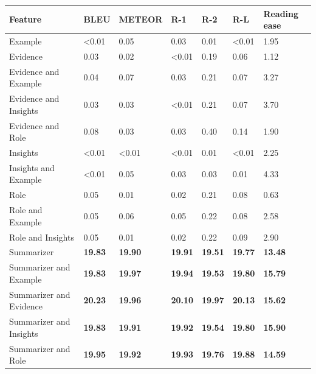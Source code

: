 \begin{tabular}{|l|l|l|l|l|l|l|}
\hline
\textbf{Feature} & BLEU & METEOR & R-1 & R-2 & R-L & Reading ease \\
 \hline
 Example & \textless{}0.01 & 0.05 & 0.03 & 0.01 & \textless{}0.01 & 1.95 \\
 \hline
 Evidence & 0.03 & 0.02 & \textless{}0.01 & 0.19 & 0.06 & 1.12 \\
 \hline
 Evidence and Example & 0.04 & 0.07 & 0.03 & 0.21 & 0.07 & 3.27 \\
 \hline
 Evidence and Insights & 0.03 & 0.03 & \textless{}0.01 & 0.21 & 0.07 & 3.70 \\
 \hline
 Evidence and Role & 0.08 & 0.03 & 0.03 & 0.40 & 0.14 & 1.90 \\
 \hline
 Insights & \textless{}0.01 & \textless{}0.01 & \textless{}0.01 & 0.01 & \textless{}0.01 & 2.25 \\
 \hline
 Insights and Example & \textless{}0.01 & 0.05 & 0.03 & 0.03 & 0.01 & 4.33 \\
 \hline
 Role & 0.05 & 0.01 & 0.02 & 0.21 & 0.08 & 0.63 \\
 \hline
 Role and Example & 0.05 & 0.06 & 0.05 & 0.22 & 0.08 & 2.58 \\
 \hline
 Role and Insights & 0.05 & 0.01 & 0.02 & 0.22 & 0.09 & 2.90 \\
 \hline
 Summarizer & \textbf{19.83} & \textbf{19.90} & \textbf{19.91} & \textbf{19.51} & \textbf{19.77} & \textbf{13.48} \\
 \hline
 Summarizer and Example & \textbf{19.83} & \textbf{19.97} & \textbf{19.94} & \textbf{19.53} & \textbf{19.80} & \textbf{15.79} \\
 \hline
 Summarizer and Evidence & \textbf{20.23} & \textbf{19.96} & \textbf{20.10} & \textbf{19.97} & \textbf{20.13} & \textbf{15.62} \\
 \hline
 Summarizer and Insights & \textbf{19.83} & \textbf{19.91} & \textbf{19.92} & \textbf{19.54} & \textbf{19.80} & \textbf{15.90} \\
 \hline
 Summarizer and Role & \textbf{19.95} & \textbf{19.92} & \textbf{19.93} & \textbf{19.76} & \textbf{19.88} & \textbf{14.59} \\
\hline
\end{tabular}
